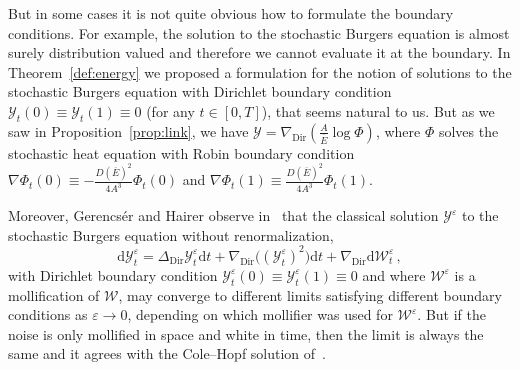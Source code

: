 \documentclass[10pt]{amsart}
\theoremstyle{definition}\newtheorem{defi}[theo]{Definition}\newtheorem{rema}[theo]{Remark}\newtheorem{exam}[theo]{Example}\newtheorem{exem}[theo]{Example}\newtheorem{nota}[theo]{Notation}
\DeclareMathOperator{\Dir}{Dir}
\newcommand{\mc}[1]{{\mathcal #1}}
\renewcommand{\mc}[1]{{\mathcal #1}}
\renewcommand{\bar}{\overline}
\newcommand*{\dd}{\mathrm{d}}
\newcommand*{\dt}{\dd t}
\renewcommand{\tfrac}{\frac}
\begin{document}
But in some cases it is not quite obvious how to formulate the boundary conditions. For example, the solution to the stochastic Burgers equation is almost surely distribution valued and therefore we cannot evaluate it at the boundary. In Theorem~\ref{def:energy} we proposed a formulation for the notion of solutions to the stochastic Burgers equation with Dirichlet boundary condition $\mc Y_t(0) \equiv \mc Y_t(1) \equiv 0$ (for any $t \in [0,T]$), that seems natural to us. But as we saw in Proposition~\ref{prop:link}, we have $\mc Y = \nabla_{\Dir} (\frac{A}{\bar{E}} \log \Phi)$, where $\Phi$ solves the stochastic heat equation with Robin boundary condition $\nabla \Phi_t(0) \equiv - \tfrac{D(\bar{E})^2}{4A^3} \Phi_t(0)$ and $\nabla \Phi_t(1) \equiv \tfrac{D(\bar{E})^2}{4A^3} \Phi_t(1)$.

Moreover, Gerencs\'er and Hairer observe in~\cite[Theorem~1.6]{Gerencser2018} that the classical solution $\mc Y^\varepsilon$ to the stochastic Burgers equation without renormalization,
\begin{equation}\label{eq:gh-approx}
\dd\mc Y^\varepsilon_t = \Delta_{\Dir} \mc Y^\varepsilon_t \dt + \nabla_{\Dir} \big((\mc Y^\varepsilon_t)^2\big) \dt + \nabla_{\Dir} \dd\mc W^\varepsilon_t \,,
\end{equation}
with Dirichlet boundary condition $\mc Y^\varepsilon_t(0) \equiv \mc Y^\varepsilon_t(1) \equiv 0$ and where $\mc W^\varepsilon$ is a mollification of $\mc W$, may converge to different limits satisfying different boundary conditions as $\varepsilon \to 0$, depending on which mollifier was used for $\mc W^\varepsilon$. But if the noise is only mollified in space and white in time, then the limit is always the same and it agrees with the Cole--Hopf solution of~\cite{Corwin2016}.
\end{document}

